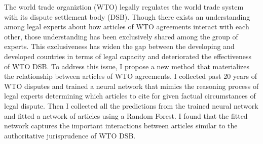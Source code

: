 The world trade organiztion (WTO) legally regulates the world trade system with its dispute settlement body (DSB).
Though there exists an understanding among legal experts about how articles of WTO agreements interact with each other, %
those understanding has been exclusively shared among the group of experts.  %
This exclusiveness has widen the gap
between the developing and developed countries in terms of
legal capacity and deteriorated the effectiveness of WTO DSB.
To address this issue, I propose a new method that materializes the relationship between articles of WTO agreements. %
I collected past 20 years of WTO disputes and trained a neural network that mimics the reasoning process of legal experts determining which articles to cite for given factual circumstances of legal dispute.
Then I collected all the predictions from the trained neural network and fitted a network of articles using a Random Forest.
I found that the fitted network captures the important interactions between articles similar to the authoritative jurisprudence of WTO DSB.
















